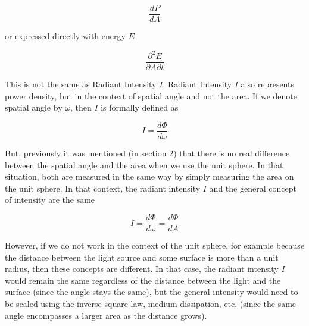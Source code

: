 \documentclass{article}
\begin{document}
\[ \frac{dP}{dA} \]

or expressed directly with energy $E$

\[ \frac{\partial^2E}{\partial A \partial t} \]

This is not the same as Radiant Intensity $I$. Radiant Intensity $I$ also represents power density, but in the context of spatial angle and not the area. If we denote spatial angle by $\omega$, then $I$ is formally defined as

\[ I = \frac{d\Phi}{d\omega} \]

But, previously it was mentioned (in section 2) that there is no real difference between the spatial angle and the area when we use the unit sphere. In that situation, both are measured in the same way by simply measuring the area on the unit sphere. In that context, the radiant intensity $I$ and the general concept of intensity are the same

\[ I = \frac{d\Phi}{d\omega} = \frac{d\Phi}{dA} \]

However, if we do not work in the context of the unit sphere, for example because the distance between the light source and some surface is more than a unit radius, then these concepts are different. In that case, the radiant intensity $I$ would remain the same regardless of the distance between the light and the surface (since the angle stays the same), but the general intensity would need to be scaled using the inverse square law, medium dissipation, etc. (since the same angle encompasses a larger area as the distance grows).
\end{document}
